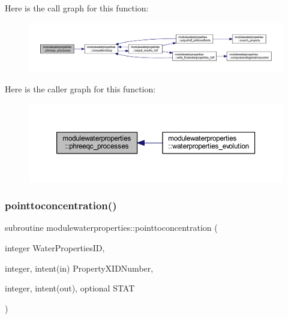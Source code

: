 Here is the call graph for this function\+:\nopagebreak
\begin{figure}[H]
\begin{center}
\leavevmode
\includegraphics[width=350pt]{namespacemodulewaterproperties_a24e8f85633a4f1ac903cfa366e4669d7_cgraph}
\end{center}
\end{figure}
Here is the caller graph for this function\+:\nopagebreak
\begin{figure}[H]
\begin{center}
\leavevmode
\includegraphics[width=350pt]{namespacemodulewaterproperties_a24e8f85633a4f1ac903cfa366e4669d7_icgraph}
\end{center}
\end{figure}
\mbox{\label{namespacemodulewaterproperties_a4a3c2baf1d479b6f25201db3550c7a46}} 
\subsubsection{\texorpdfstring{pointtoconcentration()}{pointtoconcentration()}}
{\footnotesize\ttfamily subroutine modulewaterproperties\+::pointtoconcentration (\begin{DoxyParamCaption}\item[{integer}]{Water\+Properties\+ID,  }\item[{integer, intent(in)}]{Property\+X\+I\+D\+Number,  }\item[{integer, intent(out), optional}]{S\+T\+AT }\end{DoxyParamCaption})\hspace{0.3cm}{\ttfamily [private]}}

